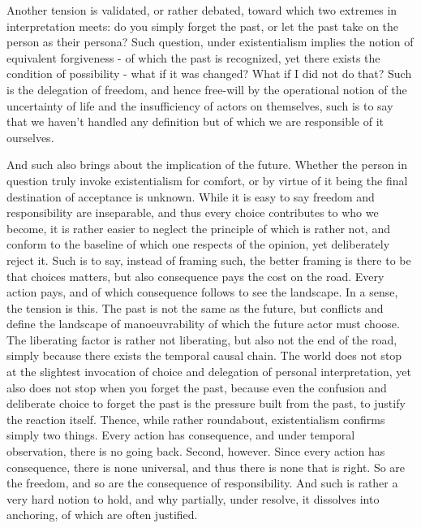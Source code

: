 Another tension is validated, or rather debated, toward which two extremes in interpretation meets: do you simply forget the past, or let the past take on the person as their persona? Such question, under existentialism implies the notion of equivalent forgiveness - of which the past is recognized, yet there exists the condition of possibility - what if it was changed? What if I did not do that? Such is the delegation of freedom, and hence free-will by the operational notion of the uncertainty of life and the insufficiency of actors on themselves, such is to say that we haven't handled any definition but of which we are responsible of it ourselves.

And such also brings about the implication of the future. Whether the person in question truly invoke existentialism for comfort, or by virtue of it being the final destination of acceptance is unknown. While it is easy to say freedom and responsibility are inseparable, and thus every choice contributes to who we become, it is rather easier to neglect the principle of which is rather not, and conform to the baseline of which one respects of the opinion, yet deliberately reject it. Such is to say, instead of framing such, the better framing is there to be that choices matters, but also consequence pays the cost on the road. Every action pays, and of which consequence follows to see the landscape. In a sense, the tension is this. The past is not the same as the future, but conflicts and define the landscape of manoeuvrability of which the future actor must choose. The liberating factor is rather not liberating, but also not the end of the road, simply because there exists the temporal causal chain. The world does not stop at the slightest invocation of choice and delegation of personal interpretation, yet also does not stop when you forget the past, because even the confusion and deliberate choice to forget the past is the pressure built from the past, to justify the reaction itself. Thence, while rather roundabout, existentialism confirms simply two things. Every action has consequence, and under temporal observation, there is no going back. Second, however. Since every action has consequence, there is none universal, and thus there is none that is right. So are the freedom, and so are the consequence of responsibility. And such is rather a very hard notion to hold, and why partially, under resolve, it dissolves into anchoring, of which are often justified. 

